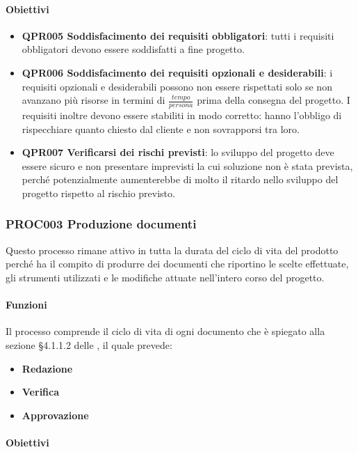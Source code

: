 		\paragraph*{Obiettivi}
		
		\begin{itemize}
			\item \textbf{QPR005 Soddisfacimento dei requisiti obbligatori}: tutti i requisiti obbligatori devono essere soddisfatti a fine progetto.
			\item \textbf{QPR006 Soddisfacimento dei requisiti opzionali e desiderabili}: i requisiti opzionali e desiderabili possono non essere rispettati solo se non avanzano più risorse in termini di $ \frac{tempo}{persona} $ prima della consegna del progetto. I requisiti inoltre devono essere stabiliti in modo corretto: hanno l'obbligo di rispecchiare quanto chiesto dal cliente e non sovrapporsi tra loro.
			\item \textbf{QPR007 Verificarsi dei rischi previsti}: lo sviluppo del progetto deve essere sicuro e non presentare imprevisti la cui soluzione non è stata prevista, perché potenzialmente aumenterebbe di molto il ritardo nello sviluppo del progetto rispetto al rischio previsto.
		\end{itemize}
	
	\subsubsection{PROC003 Produzione documenti}
	Questo processo rimane attivo in tutta la durata del ciclo di vita del prodotto perché ha il compito di produrre dei documenti che riportino le scelte effettuate, gli strumenti utilizzati e le modifiche attuate nell'intero corso del progetto.
	
		\paragraph*{Funzioni}
		Il processo comprende il ciclo di vita di ogni documento che è spiegato alla sezione §4.1.1.2 delle \Doc{\NdP}, il quale prevede:
		
		\begin{itemize}
			\item \textbf{Redazione}
			\item \textbf{Verifica}
			\item \textbf{Approvazione}
		\end{itemize}
	
		\paragraph*{Obiettivi}
		
